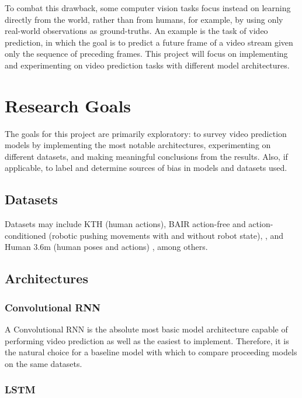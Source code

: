\documentclass[10pt, letterpaper]{article}
\begin{document}
To combat this drawback, some computer vision tasks focus instead on learning
directly from the world, rather than from humans, for example, by using only
real-world observations as ground-truths. An example is the task of video
prediction, in which the goal is to predict a future frame of a video stream
given only the sequence of preceding frames. \cite{video_prediction_survey}
This project will focus on implementing and experimenting on video prediction
tasks with different model architectures.

\section{Research Goals}

The goals for this project are primarily exploratory: to survey video
prediction models by implementing the most notable architectures, experimenting
on different datasets, and making meaningful conclusions from the results.
Also, if applicable, to label and determine sources of bias in models and
datasets used.

\subsection{Datasets}

Datasets may include KTH \cite{kth} (human actions), BAIR
action-free and action-conditioned (robotic pushing movements with and without
robot state), \cite{savp}, and Human 3.6m (human poses and actions)
\cite{humans3_6}, among others.

\subsection{Architectures}

\subsubsection{Convolutional RNN}

A Convolutional RNN is the absolute most basic model architecture capable of
performing video prediction as well as the easiest to implement. Therefore, it
is the natural choice for a baseline model with which to compare proceeding
models on the same datasets.

\subsubsection{LSTM}
\end{document}
